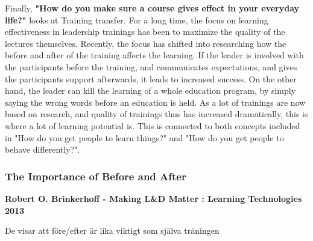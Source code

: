 Finally, \textbf{"How do you make sure a course gives effect in your everyday life?"} looks at Training transfer. For a long time, the focus on learning effectiveness in leadership trainings has been to maximize the quality of the lectures themselves. Recently, the focus has shifted into researching how the before and after of the training affects the learning. If the leader is involved with the participants before the training, and communicates expectations, and gives the participants support afterwards, it leads to increased success. On the other hand, the leader can kill the learning of a whole education program, by simply saying the wrong words before an education is held. As a lot of trainings are now based on research, and quality of trainings thus has increased dramatically, this is where a lot of learning potential is. This is connected to both concepts included in "How do you get people to learn things?" and "How do you get people to behave differently?". \\

\subsubsection{The Importance of Before and After}

\textbf{Robert O. Brinkerhoff - Making L\&D Matter : Learning Technologies 2013}

De visar att före/efter är lika viktigt som själva träningen




